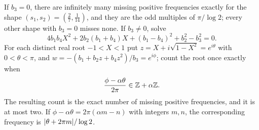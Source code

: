 \begin{theorem}\label{zer:thm:fivepoint}
If $b_3=0$, there are infinitely many missing positive frequencies exactly for the shape
$(s_1,s_2)=(\tfrac27,\tfrac1{14})$, and they are the odd multiples of $\pi/\log2$; every other shape with $b_3=0$
misses none. If $b_3\ne0$, solve
\begin{equation}\label{zer:eq:fivequad}
 4b_1b_4X^2+2b_2(b_1+b_4)X+(b_1-b_4)^2+b_2^2-b_3^2=0 .
\end{equation}
For each distinct real root $-1<X<1$ put $z=X+i\sqrt{1-X^2}=e^{i\theta}$ with $0<\theta<\pi$, and
$w=-(b_1+b_2z+b_4z^2)/b_3=e^{i\phi}$; count the root once exactly when
\begin{equation}\label{zer:eq:fivegroup}
 \frac{\phi-\alpha\theta}{2\pi}\in\mathbb{Z}+\alpha\mathbb{Z} .
\end{equation}
The resulting count is the exact number of missing positive frequencies, and it is at most two. If
$\phi-\alpha\theta=2\pi(\alpha m-n)$ with integers $m,n$, the corresponding frequency is $\lvert\theta+2\pi m\rvert/\log2$.
\end{theorem}

